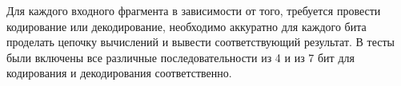 \solutionSection

Для каждого входного фрагмента в зависимости от того, требуется провести кодирование или декодирование, необходимо аккуратно для каждого бита проделать цепочку вычислений и вывести соответствующий результат. В тесты были включены все различные последовательности из 4 и из 7 бит для кодирования и декодирования соответственно.

\codeExample

